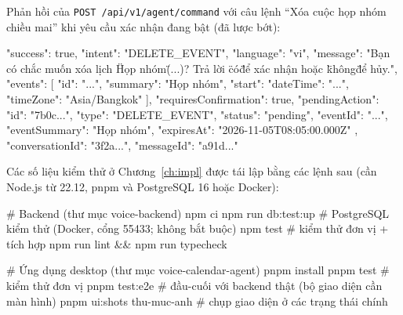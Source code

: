 Phản hồi của \texttt{POST /api/v1/agent/command} với câu lệnh “Xóa cuộc họp nhóm chiều mai” khi yêu cầu xác nhận đang bật (đã lược bớt):
\begin{code}
{
  "success": true,
  "intent": "DELETE_EVENT",
  "language": "vi",
  "message": "Bạn có chắc muốn xóa lịch \"Họp nhóm\" (...)?
              Trả lời \"có\" để xác nhận hoặc \"không\" để hủy.",
  "events": [ { "id": "...", "summary": "Họp nhóm",
                "start": { "dateTime": "...", "timeZone": "Asia/Bangkok" } } ],
  "requiresConfirmation": true,
  "pendingAction": {
    "id": "7b0c...", "type": "DELETE_EVENT", "status": "pending",
    "eventId": "...", "eventSummary": "Họp nhóm",
    "expiresAt": "2026-11-05T08:05:00.000Z"
  },
  "conversationId": "3f2a...", "messageId": "a91d..."
}
\end{code}

Các số liệu kiểm thử ở Chương~\ref{ch:impl} được tái lập bằng các lệnh sau (cần Node.js từ 22.12, pnpm và PostgreSQL 16 hoặc Docker):
\begin{code}
# Backend (thư mục voice-backend)
npm ci
npm run db:test:up          # PostgreSQL kiểm thử (Docker, cổng 55433; không bắt buộc)
npm test                    # kiểm thử đơn vị + tích hợp
npm run lint && npm run typecheck

# Ứng dụng desktop (thư mục voice-calendar-agent)
pnpm install
pnpm test                   # kiểm thử đơn vị
pnpm test:e2e               # đầu-cuối với backend thật (bộ giao diện cần màn hình)
pnpm ui:shots thu-muc-anh   # chụp giao diện ở các trạng thái chính
\end{code}
